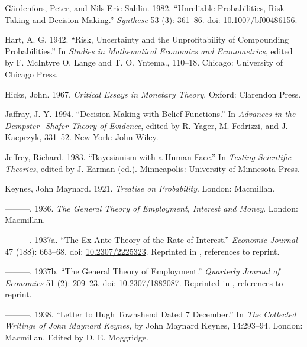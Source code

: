 \documentclass[
  11pt,
  letterpaper,
  DIV=11,
  numbers=noendperiod,
  twoside]{scrartcl}
\newlength{\cslhangindent}
\newenvironment{CSLReferences}[2] %
 {\begin{list}{}{%
  \setlength{\itemindent}{0pt}
  \setlength{\leftmargin}{0pt}
  \setlength{\parsep}{0pt}
  \ifodd #1
   \setlength{\leftmargin}{\cslhangindent}
   \setlength{\itemindent}{-1\cslhangindent}
  \fi
  \setlength{\itemsep}{#2\baselineskip}}}
 {\end{list}}
\begin{document}
\begin{CSLReferences}{1}{0}
Gärdenfors, Peter, and Nils-Eric Sahlin. 1982. {``Unreliable
Probabilities, Risk Taking and Decision Making.''} \emph{Synthese} 53
(3): 361--86. doi:
\href{https://doi.org/10.1007/bf00486156}{10.1007/bf00486156}.

Hart, A. G. 1942. {``Risk, Uncertainty and the Unprofitability of
Compounding Probabilities.''} In \emph{Studies in Mathematical Economics
and Econometrics}, edited by F. McIntyre O. Lange and T. O. Yntema.,
110--18. Chicago: University of Chicago Press.

Hicks, John. 1967. \emph{Critical Essays in Monetary Theory}. Oxford:
Clarendon Press.

Jaffray, J. Y. 1994. {``Decision Making with Belief Functions.''} In
\emph{Advances in the Dempster- Shafer Theory of Evidence}, edited by R.
Yager, M. Fedrizzi, and J. Kacprzyk, 331--52. New York: John Wiley.

Jeffrey, Richard. 1983. {``Bayesianism with a Human Face.''} In
\emph{Testing Scientific Theories}, edited by J. Earman (ed.).
Minneapolis: University of Minnesota Press.

Keynes, John Maynard. 1921. \emph{Treatise on Probability}. London:
Macmillan.

---------. 1936. \emph{The General Theory of Employment, Interest and
Money}. London: Macmillan.

---------. 1937a. {``The Ex Ante Theory of the Rate of Interest.''}
\emph{Economic Journal} 47 (188): 663--68. doi:
\href{https://doi.org/10.2307/2225323}{10.2307/2225323}. Reprinted in
\cite[XIV 215-223]{KeynesCW}, references to reprint.

---------. 1937b. {``The General Theory of Employment.''}
\emph{Quarterly Journal of Economics} 51 (2): 209--23. doi:
\href{https://doi.org/10.2307/1882087}{10.2307/1882087}. Reprinted in
\cite[XIV 109-123]{KeynesCW}, references to reprint.

---------. 1938. {``Letter to Hugh Townshend Dated 7 December.''} In
\emph{The Collected Writings of John Maynard Keynes}, by John Maynard
Keynes, 14:293--94. London: Macmillan. Edited by D. E. Moggridge.


\end{CSLReferences}
\end{document}
